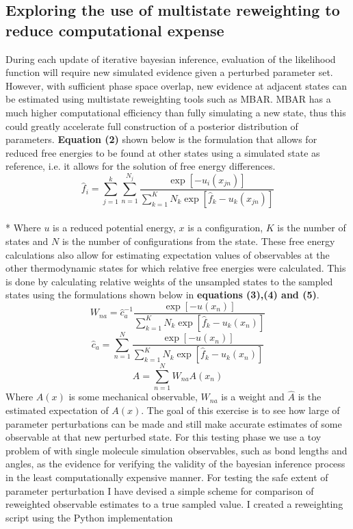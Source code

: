 \documentclass[rmp,nofootinbib,superscriptaddress,12pt,tightenlines,notitlepage]{revtex4-1}
\begin{document}
\subsection{Exploring the use of multistate reweighting to reduce computational expense}
During each update of iterative bayesian inference, evaluation of the likelihood function will require new simulated evidence given a perturbed parameter set. However, with sufficient phase space overlap, new evidence at adjacent states can be estimated using multistate reweighting tools such as MBAR. \cite{mbar} MBAR has a much higher computational efficiency than fully simulating a new state, thus this could greatly accelerate full construction of a posterior distribution of parameters. \textbf{Equation (2)} shown below is the formulation that allows for reduced free energies to be found at other states using a simulated state as reference, i.e. it allows for the solution of free energy differences.
\begin{equation} \hat{f}_i = \sum_{j=1}^{k}\sum_{n=1}^{N_j} \frac{\exp\left[-u_{i}\left(x_{jn}\right)\right]}{\sum_{k=1}^{K} N_k \exp\left[\hat{f}_k - u_{k}\left(x_{jn}\right)\right]}\end{equation}\\*
Where $u$ is a reduced potential energy, $x$ is a configuration, $K$ is the number of states and $N$ is the number of configurations from the state. These free energy calculations also allow for estimating expectation values of observables at the other thermodynamic states for which relative free energies were calculated. This is done by calculating relative weights of the unsampled states to the sampled states using the formulations shown below in \textbf{equations (3),(4) and (5)}.
\begin{equation} W_{na} = \hat{c}_{a}^{-1} \frac{\exp\left[-u\left(x_{n}\right)\right]}{\sum_{k=1}^{K} N_k \exp\left[\hat{f}_k - u_{k}\left(x_{n}\right)\right]}\end{equation}
\begin{equation} \hat{c}_a = \sum_{n=1}^{N} \frac{\exp\left[-u\left(x_{n}\right)\right]}{\sum_{k=1}^{K} N_k \exp\left[\hat{f}_k - u_{k}\left(x_{n}\right)\right]}\end{equation}
\begin{equation} \hat{A} = \sum_{n=1}^{N} W_{na} A\left(x_n\right)\end{equation}
Where $A(x)$ is some mechanical observable, $W_{na}$ is a weight and $\hat{A}$ is the estimated expectation of $A(x)$. 
The goal of this exercise is to see how large of parameter perturbations can be made and still make accurate estimates of some observable at that new perturbed state. For this testing phase we use a toy problem of with single molecule simulation observables, such as bond lengths and angles, as the evidence for verifying the validity of the bayesian inference process in the least computationally expensive manner. For testing the safe extent of parameter perturbation I have devised a simple scheme for comparison of reweighted observable estimates to a true sampled value. I created a reweighting script using the Python implementation
\end{document}
